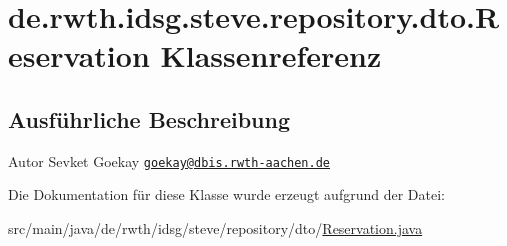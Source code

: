 \hypertarget{classde_1_1rwth_1_1idsg_1_1steve_1_1repository_1_1dto_1_1_reservation}{\section{de.\+rwth.\+idsg.\+steve.\+repository.\+dto.\+Reservation Klassenreferenz}
\label{classde_1_1rwth_1_1idsg_1_1steve_1_1repository_1_1dto_1_1_reservation}
}


\subsection{Ausführliche Beschreibung}
\begin{DoxyAuthor}{Autor}
Sevket Goekay \href{mailto:goekay@dbis.rwth-aachen.de}{\tt goekay@dbis.\+rwth-\/aachen.\+de} 
\end{DoxyAuthor}


Die Dokumentation für diese Klasse wurde erzeugt aufgrund der Datei\+:\begin{DoxyCompactItemize}
\item 
src/main/java/de/rwth/idsg/steve/repository/dto/\hyperlink{_reservation_8java}{Reservation.\+java}\end{DoxyCompactItemize}
